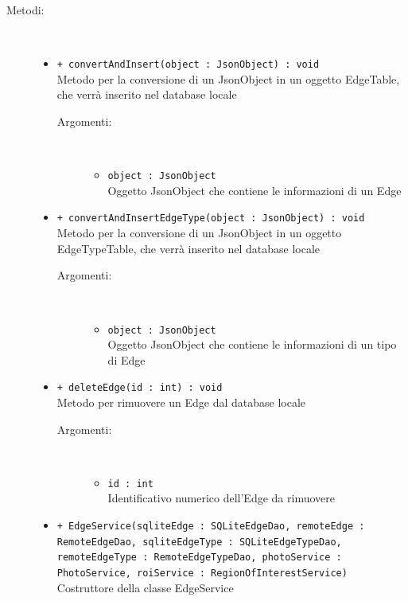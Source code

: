 \documentclass[../DefinizioneDiProdotto.tex]{subfiles}
\begin{document}
\begin{description}
\begin{itemize}
\end{itemize}
\item[Metodi:] \
\begin{itemize}
\item \texttt{+ convertAndInsert(object : JsonObject) : void}\\
Metodo per la conversione di un JsonObject in un oggetto EdgeTable, che verrà inserito nel database locale
 \begin{description}
\item[Argomenti:] \
\begin{itemize}
\item \texttt{object : JsonObject}\\
Oggetto JsonObject che contiene le informazioni di un Edge\end{itemize}
\end{description}
\item \texttt{+ convertAndInsertEdgeType(object : JsonObject) : void}\\
Metodo per la conversione di un JsonObject in un oggetto EdgeTypeTable, che verrà inserito nel database locale
 \begin{description}
\item[Argomenti:] \
\begin{itemize}
\item \texttt{object : JsonObject}\\
Oggetto JsonObject che contiene le informazioni di un tipo di Edge\end{itemize}
\end{description}
\item \texttt{+ deleteEdge(id : int) : void}\\
Metodo per rimuovere un Edge dal database locale
 \begin{description}
\item[Argomenti:] \
\begin{itemize}
\item \texttt{id : int}\\
Identificativo numerico dell'Edge da rimuovere\end{itemize}
\end{description}
\item \texttt{+ EdgeService(sqliteEdge : SQLiteEdgeDao, remoteEdge : RemoteEdgeDao, sqliteEdgeType : SQLiteEdgeTypeDao, remoteEdgeType : RemoteEdgeTypeDao, photoService : PhotoService, roiService : RegionOfInterestService)}\\
Costruttore della classe EdgeService
 \begin{description}

\end{description}
\end{itemize}
\end{description}
\end{document}
